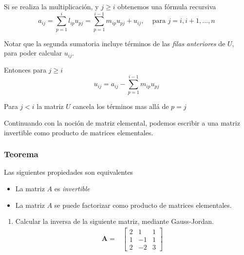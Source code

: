 \documentclass[
]{article}
\providecommand{\tightlist}{%
  \setlength{\itemsep}{0pt}\setlength{\parskip}{0pt}}
\begin{document}
Si se realiza la multiplicación, y \(j\geq i\) obtenemos una fórmula
recursiva \begin{equation}
  a_{ij} = \sum_{p=1}^{i} l_{ip}u_{pj} = \sum_{p=1}^{i-1}m_{ip}u_{pj} + u_{ij},\,\,\,\,\, 
  \mbox{ para } j=i,i+1,\ldots,n
\end{equation}

Notar que la segunda sumatoria incluye términos de las \emph{filas}
\emph{anteriores} de \(U\), para poder calcular \(u_{ij}\).

Entonces para \(j\geq i\) \begin{equation}
u_{ij} = a_{ij} - \sum_{p=1}^{i-1} m_{ip}u_{pj}
\end{equation}

Para \(j<i\) la matriz \(U\) cancela los términos mas allá de \(p=j\)

Continuando con la noción de matriz elemental, podemos escribir a una
matriz invertible como producto de matrices elementales.

\hypertarget{teorema-4}{%
\subsubsection{Teorema}\label{teorema-4}}

Las siguientes propiedades son equivalentes

\begin{itemize}
\item
  La matriz \(A\) es \emph{invertible}
\item
  La matriz \(A\) se puede factorizar como producto de matrices
  elementales.
\end{itemize}

\begin{enumerate}
\def\labelenumi{\arabic{enumi}.}
\setcounter{enumi}{2}
\tightlist
\item
  Calcular la inversa de la siguiente matriz, mediante Gauss-Jordan.
  \begin{equation*}
  \begin{array}{cc}
  \mathbf{A}  =&  \begin{bmatrix} 2 &  1 & 1 \\
                              1 & -1 & 1 \\
                              2 & -2 & 3
               \end{bmatrix}
  \end{array}
  \end{equation*}
\end{enumerate}
\end{document}
